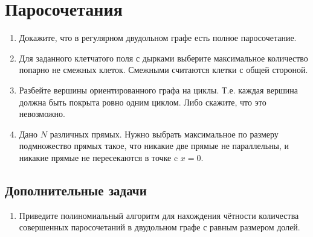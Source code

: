 \section*{Паросочетания}
\begin{enumerate}
	\item Докажите, что в регулярном двудольном графе есть полное паросочетание.
	\item Для заданного клетчатого поля с дырками выберите максимальное количество попарно не смежных клеток. 
	Смежными считаются клетки с общей стороной.
	\item Разбейте вершины ориентированного графа на циклы. Т.е. каждая вершина должна быть покрыта ровно одним 
	циклом. Либо скажите, что это невозможно.
	\item Дано $N$ различных прямых. Нужно выбрать максимальное по размеру подмножество прямых такое, что никакие 
	две прямые не параллельны, и никакие прямые не пересекаются в точке c $x = 0$.
\end{enumerate}

\subsection*{Дополнительные задачи}
\begin{enumerate}
	\item Приведите полиномиальный алгоритм для нахождения чётности количества совершенных паросочетаний в 
	двудольном графе с равным размером долей.
\end{enumerate}